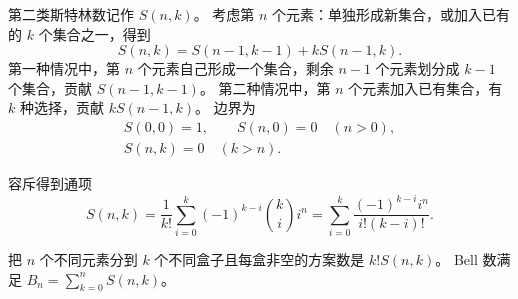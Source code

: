 第二类斯特林数记作 $S(n,k)$。
考虑第 $n$ 个元素：单独形成新集合，或加入已有的 $k$ 个集合之一，得到
\[
  S(n,k)=S(n-1,k-1)+kS(n-1,k).
\]
第一种情况中，第 $n$ 个元素自己形成一个集合，剩余 $n-1$ 个元素划分成 $k-1$ 个集合，贡献 $S(n-1,k-1)$。
第二种情况中，第 $n$ 个元素加入已有集合，有 $k$ 种选择，贡献 $kS(n-1,k)$。
边界为
\[
  \begin{gathered}
    S(0,0)=1,\qquad S(n,0)=0\quad(n>0),\\
    S(n,k)=0\quad(k>n).
  \end{gathered}
\]

容斥得到通项
\[
  S(n,k)=\frac1{k!}\sum_{i=0}^{k}(-1)^{k-i}\binom ki i^n
  =\sum_{i=0}^{k}\frac{(-1)^{k-i}i^n}{i!(k-i)!}.
\]

\begin{icpcresult}[相关计数]
  把 $n$ 个不同元素分到 $k$ 个不同盒子且每盒非空的方案数是 $k!S(n,k)$。
  Bell 数满足 $B_n=\sum_{k=0}^{n}S(n,k)$。
\end{icpcresult}
